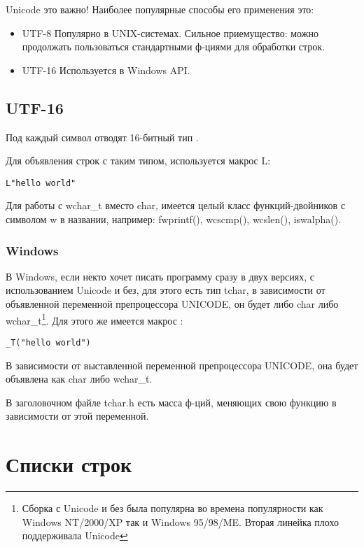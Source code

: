 Unicode это важно! Наиболее популярные способы его применения это:

\begin{itemize}
\item UTF-8
Популярно в UNIX-системах. Сильное приемущество: можно продолжать пользоваться стандартными ф-циями для
обработки строк.

\item UTF-16
Используется в Windows API.
\end{itemize}

\subsection{UTF-16}

Под каждый символ отводят 16-битный тип .

Для объявления строк с таким типом, используется макрос L:

\begin{lstlisting}
L"hello world"
\end{lstlisting}

Для работы с wchar\_t вместо char, имеется целый класс функций-двойников с символом w в названии,
например: fwprintf(), wcscmp(), wcslen(), iswalpha().

\subsubsection{Windows}

В Windows, если некто хочет писать программу сразу в двух версиях, с использованием Unicode и без,
для этого есть тип tchar, в зависимости от объявленной переменной препроцессора UNICODE, 
он будет либо char либо wchar\_t\footnote{Сборка с Unicode и без была популярна во времена популярности
как Windows NT/2000/XP так и Windows 95/98/ME. Вторая линейка плохо поддерживала Unicode}.
Для этого же имеется макрос :

\begin{lstlisting}
_T("hello world")
\end{lstlisting}

В зависимости от выставленной переменной препроцессора UNICODE, она будет объявлена как char либо wchar\_t.

В заголовочном файле tchar.h есть масса ф-ций, меняющих свою функцию в зависимости от этой переменной.

\section{Списки строк}


